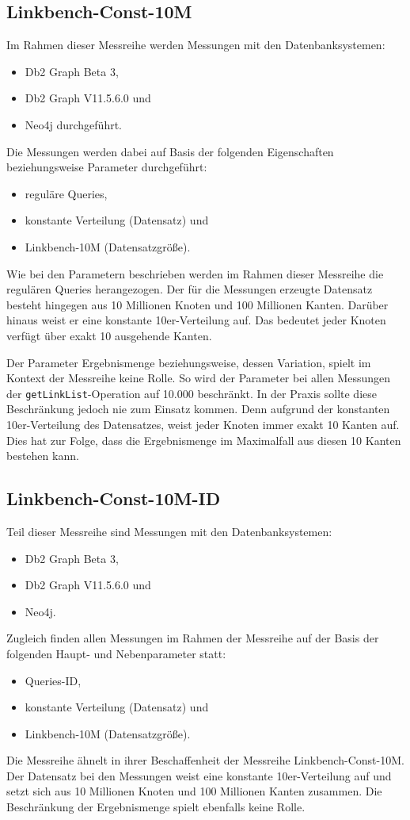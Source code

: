 \subsection{Linkbench-Const-10M}
Im Rahmen dieser Messreihe werden Messungen mit den Datenbanksystemen:
\begin{itemize}
    \item Db2 Graph Beta 3,
    \item Db2 Graph V11.5.6.0 und 
    \item Neo4j durchgeführt. 
\end{itemize}
Die Messungen werden dabei auf Basis der folgenden Eigenschaften beziehungsweise Parameter durchgeführt:
\begin{itemize}
    \item reguläre Queries,
    \item konstante Verteilung (Datensatz) und
    \item Linkbench-10M (Datensatzgröße).
\end{itemize}
Wie bei den Parametern beschrieben werden im Rahmen dieser Messreihe die regulären Queries herangezogen. Der für die Messungen erzeugte Datensatz besteht hingegen aus 10 Millionen Knoten und 100 Millionen Kanten. Darüber hinaus weist er eine konstante 10er-Verteilung auf. Das bedeutet jeder Knoten verfügt über exakt 10 ausgehende Kanten. 

Der Parameter Ergebnismenge beziehungsweise, dessen Variation, spielt im Kontext der Messreihe keine Rolle. So wird der Parameter bei allen Messungen der \texttt{getLinkList}-Operation auf 10.000 beschränkt. In der Praxis sollte diese Beschränk\-ung jedoch nie zum Einsatz kommen. Denn aufgrund der konstanten 10er-Verteilung des Datensatzes, weist jeder Knoten immer exakt 10 Kanten auf. Dies hat zur Folge, dass die Ergebnismenge im Maximalfall aus diesen 10 Kanten bestehen kann. 

\subsection{Linkbench-Const-10M-ID}
Teil dieser Messreihe sind Messungen mit den Datenbanksystemen:
\begin{itemize}
    \item Db2 Graph Beta 3,
    \item Db2 Graph V11.5.6.0 und 
    \item Neo4j. 
\end{itemize}

Zugleich finden allen Messungen im Rahmen der Messreihe auf der Basis der folgenden Haupt- und Nebenparameter statt:
\begin{itemize}
    \item Queries-ID,
    \item konstante Verteilung (Datensatz) und
    \item Linkbench-10M (Datensatzgröße).
\end{itemize}
Die Messreihe ähnelt in ihrer Beschaffenheit der Messreihe Linkbench-Const-10M. Der Datensatz bei den Messungen weist eine konstante 10er-Verteilung auf und setzt sich aus 10 Millionen Knoten und 100 Millionen Kanten zusammen. Die Beschränkung der Ergebnismenge spielt ebenfalls keine Rolle. 

